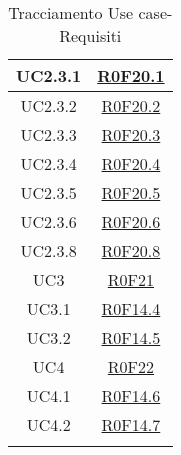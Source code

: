 \documentclass[../AnalisiDeiRequisiti.tex]{subfiles}
\begin{document}
\begin{longtable}{|c|c|}
	UC2.3.1 & \hyperlink{R0F20.1}{R0F20.1}\\\hline
	UC2.3.2 & \hyperlink{R0F20.2}{R0F20.2}\\\hline
	UC2.3.3 & \hyperlink{R0F20.3}{R0F20.3}\\\hline
	UC2.3.4 & \hyperlink{R0F20.4}{R0F20.4}\\\hline
	UC2.3.5 & \hyperlink{R0F20.5}{R0F20.5}\\\hline
	UC2.3.6 & \hyperlink{R0F20.6}{R0F20.6}\\\hline
	UC2.3.8 & \hyperlink{R0F20.8}{R0F20.8}\\\hline
	UC3 & \hyperlink{R0F21}{R0F21}\\\hline
	UC3.1 & \hyperlink{R0F14.4}{R0F14.4}\\\hline
	UC3.2 & \hyperlink{R0F14.5}{R0F14.5}\\\hline
	UC4 & \hyperlink{R0F22}{R0F22}\\\hline
	UC4.1 & \hyperlink{R0F14.6}{R0F14.6}\\\hline
	UC4.2 & \hyperlink{R0F14.7}{R0F14.7}\\\hline
	\caption[Tracciamento Use case-Requisiti]{Tracciamento Use case-Requisiti}
	\label{tabella:usecase-requi}
\end{longtable}
\clearpage
\end{document}
